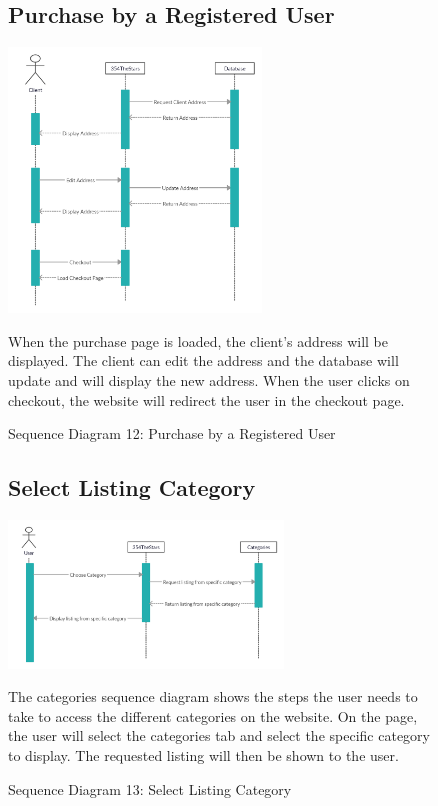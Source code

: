 \documentclass[11pt]{article}
\newcounter{use case ID}
\newcounter{req ID}
\begin{document}
\begin{figure}[ht!]
    \subsection{Purchase by a Registered User}
    \centering
    \includegraphics[width=0.6\textwidth,height=0.3\paperheight]{Diagrams/Sequence/Registered_User_Purchase.jpg}
    \caption{Sequence Diagram 12: Purchase by a Registered User}
    \label{fig: Purchase by a Registered User}
    \begin{justify}
        When the purchase page is loaded, the client's address will be displayed. The client can edit the address and the database will update and will display the new address. When the user clicks on checkout, the website will redirect the user in the checkout page.
    \end{justify}
\end{figure}

\begin{figure}[ht!]
    \subsection{Select Listing Category}
    \centering
    \includegraphics[width=0.65\textwidth,height=0.2\paperheight]{Diagrams/Sequence/Categories.png}
    \caption{Sequence Diagram 13: Select Listing Category}
    \label{fig: Select Listing Category}
    \begin{justify}
        The categories sequence diagram shows the steps the user needs to take to access the different categories on the website. On the page, the user will select the categories tab and select the specific category to display. The requested listing will then be shown to the user.
    \end{justify}
\end{figure}
\end{document}
